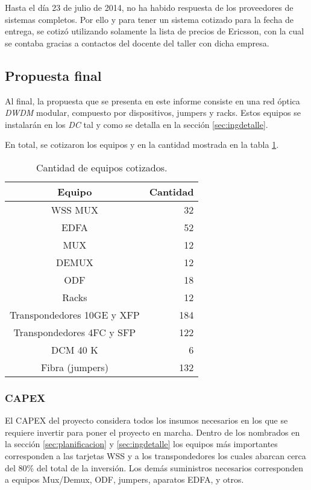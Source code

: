 
Hasta el día 23 de julio de 2014, no ha habido respuesta de los
proveedores de sistemas completos. Por ello y para tener un sistema
cotizado para la fecha de entrega, se cotizó utilizando solamente la
lista de precios de Ericsson, con la cual se contaba gracias a
contactos del docente del taller con dicha empresa.

\subsection{Propuesta final}
\label{sec:ppfinal}

Al final, la propuesta que se presenta en este informe consiste en una
red óptica \emph{DWDM} modular, compuesto por dispositivos, jumpers y
racks. Estos equipos se instalarán en los \emph{DC} tal y como se
detalla en la sección \ref{sec:ingdetalle}.

En total, se cotizaron los equipos y en la cantidad mostrada en la
tabla \ref{tab:propfinal}.

\begin{table}[H]
  \centering
  \begin{tabular}{| c | r |}
    \hline
    Equipo & Cantidad \\
    \hline
    WSS MUX & 32 \\
    EDFA & 52 \\
    MUX & 12 \\
    DEMUX & 12 \\
    ODF & 18 \\
    Racks & 12 \\
    Transpondedores 10GE y XFP & 184 \\
    Transpondedores 4FC y SFP & 122 \\
    DCM 40 K & 6 \\
    Fibra (jumpers) & 132 \\
    \hline
  \end{tabular}
  \caption{Cantidad de equipos cotizados.}
  \label{tab:propfinal}
\end{table}

\subsubsection{CAPEX}
\label{sec:capex}

El CAPEX del proyecto considera todos los insumos necesarios en los que se requiere invertir para poner el proyecto en marcha. Dentro de los nombrados en la sección \ref{sec:planificacion} y \ref{sec:ingdetalle} los equipos más importantes corresponden a las tarjetas WSS y a los transpondedores los cuales abarcan cerca del 80\% del total de la inversión. Los demás suministros necesarios corresponden a equipos Mux/Demux, ODF, jumpers, aparatos EDFA, y otros.

